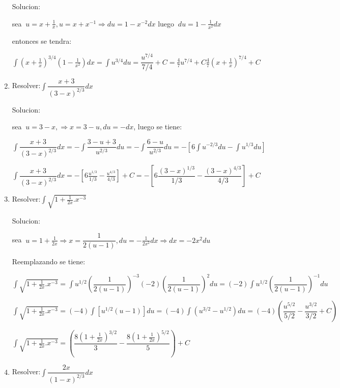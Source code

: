 \documentclass[10pt,a4paper]{book}
\newcommand{\ds}{\displaystyle}
\begin{document}
\begin{enumerate}
        Solucion:

        sea $\ds\ u=x+\frac{1}{x},u=x+x^{-1}\Rightarrow  du=1-x^{-2}dx$ luego $\ds\ du=1-\frac{1}{x^2}dx$ 

        entonces se tendra:

        $\ds\int\left(x+\frac{1}{x} \right)^{3/4}\left(1-\frac{1}{x^2} \right)dx=\int u^{3/4}du=\dfrac{u^{7/4} }{7/4}+C
        =\frac{4}{7}u^{7/4}+C  \frac{4}{7}\left(x+\frac{1}{x} \right)^{7/4}+C$

    \vspace{0.5cm}
    \item Resolver:$\ds\int\dfrac{x+3}{(3-x)^{2/3}}dx$

        Solucion:

        sea $\ds\ u=3-x,\Rightarrow x=3-u,du=-dx$, luego se tiene: 

        $\ds\int\dfrac{x+3}{(3-x)^{2/3}}dx=-\int\dfrac{3-u+3}{u^{2/3}}du=-\int\dfrac{6-u}{u^{2/3}}du=-
        \left[6\int u^{-2/3}du-\int u^{1/3}du\right]$

        $\ds\int\dfrac{x+3}{(3-x)^{2/3}}dx=-\left[6\frac{u^{1/3}}{1/3}-\frac{u^{4/3}}{4/3}\right]+C=-
        \left[6\dfrac{(3-x)^{1/3}}{1/3}-\dfrac{(3-x)^{4/3}}{4/3}\right]+C$
    

    \vspace{0.5cm}
    \item Resolver:$\ds\int\sqrt{1+\frac{1}{2x}.x^{-3}} $
    
        Solucion:

        sea $\ds\ u=1+\frac{1}{2x}\Rightarrow x=\dfrac{1}{2(u-1)},du=-\frac{1}{2x^2}dx\Rightarrow dx=-2x^2du$ 
        
        Reemplazando se tiene:

        $\ds\int\sqrt{1+\frac{1}{2x}.x^{-3}}=\int u^{1/2}\left(\dfrac{1}{2(u-1)}\right)^{-3} (-2)\left(\dfrac{1}{2(u-1)}\right)^{2}
        du=(-2)\int u^{1/2}\left(\dfrac{1}{2(u-1)}\right)^{-1}du$

        $\ds\int\sqrt{1+\frac{1}{2x}.x^{-3}}=(-4)\int[u^{1/2}(u-1)]du=(-4)\int(u^{3/2}-u^{1/2})
        du=(-4)\left(\dfrac{u^{5/2}}{5/2}-\dfrac{u^{3/2}}{3/2}+C\right) $

        $\ds\int\sqrt{1+\frac{1}{2x}.x^{-3}}=\left(\dfrac{8\left(1+\frac{1}{2x}\right)^{3/2}}{3}-\dfrac{8\left(1+\frac{1}{2x}\right)^{5/2}}{5}\right)+C $

    \vspace{0.5cm}
    \item Resolver:$\ds\int\dfrac{2x}{(1-x)^{2/3}}dx$
    

\end{enumerate}
\end{document}
